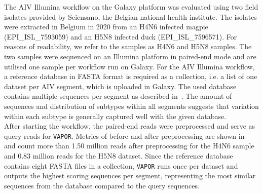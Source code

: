 The \ac{AIV} Illumina workflow on the Galaxy platform was evaluated using two field isolates provided by Sciensano, the Belgian national health institute. The isolates were extracted in Belgium in 2020 from an H4N6 infected magpie (EPI\_ISL\_7593059) and an H5N8 infected duck (EPI\_ISL\_7596571). For reasons of readability, we refer to the samples as H4N6 and H5N8 samples. The two samples were sequenced on an Illumina platform in paired-end mode and are utilised one sample per workflow run on Galaxy. For the \ac{AIV} Illumina workflow, a reference database in FASTA format is required as a collection, i.e. a list of one dataset per \ac{AIV} segment, which is uploaded in Galaxy. The used database contains multiple sequences per segment as described in~. The amount of sequences and distribution of subtypes within all segments suggests that variation within each subtype is generally captured well with the given database.\\
After starting the workflow, the paired-end reads were preprocessed and serve as query reads for \texttt{VAPOR}. Metrics of before and after preprocessing are shown in~ and count more than 1.50 million reads after preprocessing for the H4N6 sample and 0.83 million reads for the H5N8 dataset. Since the reference database contains eight FASTA files in a collection, \texttt{VAPOR} runs once per dataset and outputs the highest scoring sequences per segment, representing the most similar sequences from the database compared to the query sequences. \\

